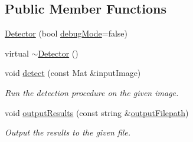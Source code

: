 \subsection*{\-Public \-Member \-Functions}
\begin{DoxyCompactItemize}
\item 
\hyperlink{classmultiscale_1_1analysis_1_1Detector_ae761f485926eead354aa361f1f57e167}{\-Detector} (bool \hyperlink{classmultiscale_1_1analysis_1_1Detector_a4b42f796957efd6ee0b8cf7645494a65}{debug\-Mode}=false)
\item 
virtual \hyperlink{classmultiscale_1_1analysis_1_1Detector_ae16b7bf62f39cb287927d56ca17663d7}{$\sim$\-Detector} ()
\item 
void \hyperlink{classmultiscale_1_1analysis_1_1Detector_acfb9aaec94382e4a7bee6d9874d4bcef}{detect} (const \-Mat \&input\-Image)
\begin{DoxyCompactList}\small\item\em \-Run the detection procedure on the given image. \end{DoxyCompactList}\item 
void \hyperlink{classmultiscale_1_1analysis_1_1Detector_a122d92e3710571c136339747bf0568e8}{output\-Results} (const string \&\hyperlink{classmultiscale_1_1analysis_1_1Detector_a1a83df16d8afd347c0e1c9ddc41c9bee}{output\-Filepath})
\begin{DoxyCompactList}\small\item\em \-Output the results to the given file. \end{DoxyCompactList}\end{DoxyCompactItemize}
